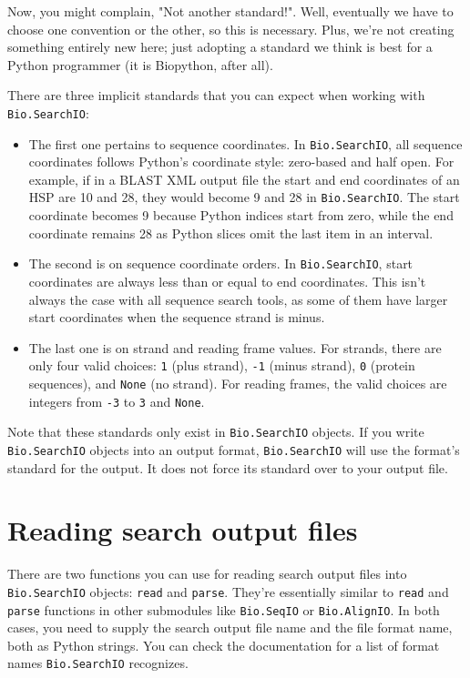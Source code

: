 \documentclass{report}
\begin{document}
Now, you might complain, "Not another standard!". Well, eventually we have to
choose one convention or the other, so this is necessary. Plus, we're not
creating something entirely new here; just adopting a standard we think is best
for a Python programmer (it is Biopython, after all).

There are three implicit standards that you can expect when working with
\verb|Bio.SearchIO|:

\begin{itemize}
\item The first one pertains to sequence coordinates. In \verb|Bio.SearchIO|,
    all sequence coordinates follows Python's coordinate style: zero-based and
    half open. For example, if in a BLAST XML output file the start and end
    coordinates of an HSP are 10 and 28, they would become 9 and 28 in
    \verb|Bio.SearchIO|. The start coordinate becomes 9 because Python indices
    start from zero, while the end coordinate remains 28 as Python slices omit
    the last item in an interval.
\item The second is on sequence coordinate orders. In \verb|Bio.SearchIO|, start
    coordinates are always less than or equal to end coordinates. This isn't
    always the case with all sequence search tools, as some of them have larger
    start coordinates when the sequence strand is minus.
\item The last one is on strand and reading frame values. For strands, there are
    only four valid choices: \verb|1| (plus strand), \verb|-1| (minus strand),
    \verb|0| (protein sequences), and \verb|None| (no strand). For reading
    frames, the valid choices are integers from \verb|-3| to \verb|3| and
    \verb|None|.
\end{itemize}

Note that these standards only exist in \verb|Bio.SearchIO| objects. If you
write \verb|Bio.SearchIO| objects into an output format, \verb|Bio.SearchIO|
will use the format's standard for the output. It does not force its standard
over to your output file.

\section{Reading search output files}
\label{sec:searchio-input}

There are two functions you can use for reading search output files into
\verb|Bio.SearchIO| objects: \verb|read| and \verb|parse|. They're essentially
similar to \verb|read| and \verb|parse| functions in other submodules like
\verb|Bio.SeqIO| or \verb|Bio.AlignIO|. In both cases, you need to supply the
search output file name and the file format name, both as Python strings. You
can check the documentation for a list of format names \verb|Bio.SearchIO|
recognizes.
\end{document}
